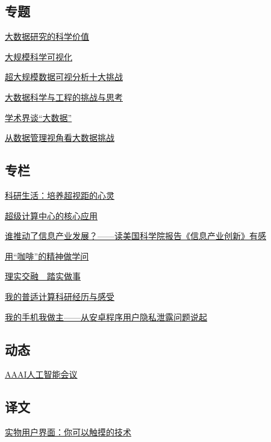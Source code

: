 \documentclass[a4paper]{article}
\begin{document}
\subsection{专题}
\href{http://history.ccf.org.cn/resources/1190201776262/2012/09/13/2.pdf}{大数据研究的科学价值}

\href{http://history.ccf.org.cn/resources/1190201776262/2012/09/13/5.pdf}{大规模科学可视化}

\href{http://history.ccf.org.cn/resources/1190201776262/2012/09/13/6.pdf}{超大规模数据可视分析十大挑战}

\href{http://history.ccf.org.cn/resources/1190201776262/2012/09/13/4.pdf}{大数据科学与工程的挑战与思考}

\href{http://history.ccf.org.cn/resources/1190201776262/2012/09/13/1.pdf}{学术界谈“大数据”}

\href{http://history.ccf.org.cn/resources/1190201776262/2012/09/13/3.pdf}{从数据管理视角看大数据挑战}

\subsection{专栏}
\href{http://history.ccf.org.cn/resources/1190201776262/2012/09/13/8.pdf}{科研生活：培养超视距的心灵}

\href{http://history.ccf.org.cn/resources/1190201776262/2012/09/13/10.pdf}{超级计算中心的核心应用}

\href{http://history.ccf.org.cn/resources/1190201776262/2012/09/13/7.pdf}{谁推动了信息产业发展？——读美国科学院报告《信息产业创新》有感}

\href{http://history.ccf.org.cn/resources/1190201776262/2012/09/13/12.pdf}{用“咖啡”的精神做学问}

\href{http://history.ccf.org.cn/resources/1190201776262/2012/09/13/13.pdf}{理实交融　踏实做事}

\href{http://history.ccf.org.cn/resources/1190201776262/2012/09/13/11.pdf}{我的普适计算科研经历与感受}

\href{http://history.ccf.org.cn/resources/1190201776262/2012/09/13/9.pdf}{我的手机我做主——从安卓程序用户隐私泄露问题说起}

\subsection{动态}
\href{http://history.ccf.org.cn/resources/1190201776262/2012/09/13/14.pdf}{AAAI人工智能会议}

\subsection{译文}
\href{http://history.ccf.org.cn/resources/1190201776262/2012/09/13/15.pdf}{实物用户界面：你可以触摸的技术}
\end{document}
